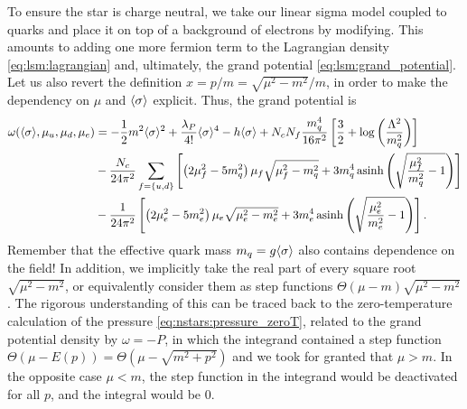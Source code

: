 To ensure the star is charge neutral, we take our linear sigma model coupled to quarks and place it on top of a background of electrons by modifying.
This amounts to adding one more fermion term to the Lagrangian density \eqref{eq:lsm:lagrangian} and, ultimately, the grand potential \eqref{eq:lsm:grand_potential}.
Let us also revert the definition $x = p / m = \sqrt{\mu^2-m^2} / m$, in order to make the dependency on $\mu$ and $\langle \sigma \rangle$ explicit.
Thus, the grand potential is
\begin{equation}
\begin{split}
	\omega(\langle \sigma \rangle,\mu_u,\mu_d,\mu_e) &= -\frac12 m^2 \langle \sigma \rangle^2 + \frac{\lambda_P}{4!} \langle \sigma \rangle^4 - h \langle \sigma \rangle + N_c N_f \frac{m_q^4}{16 \pi^2} \left[ \frac{3}{2} + \log\left(\frac{{\Lambda}^2}{m_q^2}\right) \right] \\
	                                       &- \frac{N_c}{24 \pi^2} \sum_{f=\{u,d\}} \left[ \left( 2 \mu_f^2 - 5 m_q^2 \right) \mu_f \sqrt{\mu_f^2 - m_q^2} + 3 m_q^4 \operatorname{asinh} \left( \sqrt{\frac{\mu_{\smash{f}}^2}{m_q^2}-1} \right) \right] \\
	                                       &- \frac{  1}{24 \pi^2} \left[ \left( 2 \mu_e^2 - 5 m_e^2 \right) \mu_e \sqrt{\mu_e^2 - m_e^2} + 3 m_e^4 \operatorname{asinh} \left( \sqrt{\frac{\mu_e^2}{m_e^2}-1} \right) \right] .
\end{split}
\label{eq:lsm:grand_potential}
\end{equation}
Remember that the effective quark mass $m_q = g \langle \sigma \rangle$ also contains dependence on the field!
In addition, we implicitly take the real part of every square root $\sqrt{\mu^2 - m^2}$, or equivalently consider them as step functions $\Theta(\mu-m) \sqrt{\mu^2 - m^2}$.
The rigorous understanding of this can be traced back to the zero-temperature calculation of the pressure \eqref{eq:nstars:pressure_zeroT}, related to the grand potential density by $\omega = -P$, in which the integrand contained a step function $\Theta(\mu-E(p)) = \Theta(\mu-\sqrt{m^2+p^2})$ and we took for granted that $\mu > m$.
In the opposite case $\mu < m$, the step function in the integrand would be deactivated for all $p$, and the integral would be $0$.

